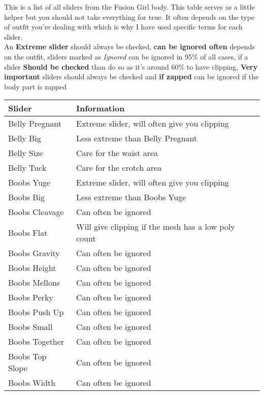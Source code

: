 \setlength{\tabcolsep}{10pt}
\renewcommand{\arraystretch}{1.5}

This is a list of all sliders from the Fusion Girl body. This table serves as a little helper but you should not take everything 
for true. It often depends on the type of outfit you're dealing with which is why I have used specific terms for each slider.\\
An \textbf{Extreme slider} should always be checked, \textbf{can be ignored often} depends on the outfit, sliders marked as 
\textit{Ignored} can be ignored in 95\% of all cases, if a slider \textbf{Should be checked} than do so as it's around 60\% to 
have clipping, \textbf{Very important} sliders should always be checked and \textbf{if zapped} can be ignored if the body part is 
zapped

\begin{longtable}{| p{} | p{} |}
    \hline
    \textbf{Slider} & \textbf{Information} \\ \hline
    Belly Pregnant & Extreme slider, will often give you clipping \\ \hline
    Belly Big & Less extreme than Belly Pregnant \\ \hline
    Belly Size & Care for the waist area \\ \hline
    Belly Tuck & Care for the crotch area \\ \hline
    Boobs Yuge & Extreme slider, will often give you clipping \\ \hline
    Boobs Big & Less extreme than Boobs Yuge \\ \hline
    Boobs Cleavage & Can often be ignored \\ \hline
    Boobs Flat & Will give clipping if the mesh has a low poly count \\ \hline
    Boobs Gravity & Can often be ignored \\ \hline
    Boobs Height & Can often be ignored \\ \hline
    Boobs Mellons & Can often be ignored \\ \hline
    Boobs Perky & Can often be ignored \\ \hline
    Boobs Push Up & Can often be ignored \\ \hline
    Boobs Small & Can often be ignored \\ \hline
    Boobs Together & Can often be ignored \\ \hline
    Boobs Top Slope & Can often be ignored \\ \hline
    Boobs Width & Can often be ignored \\ \hline

\end{longtable}
